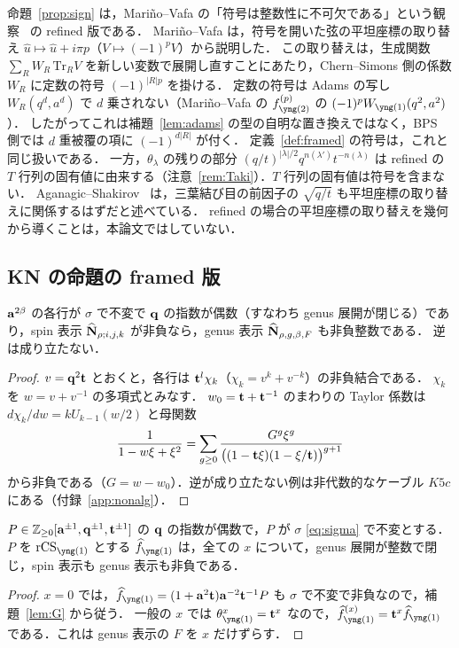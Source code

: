 命題~\ref{prop:sign} は，Mariño--Vafa の「符号は整数性に不可欠である」という観察~\cite{Marino01} の refined 版である．
Mariño--Vafa は，符号を開いた弦の平坦座標の取り替え $\hat u\mapsto\hat u+i\pi p$（$V\mapsto(-1)^pV$）から説明した．
この取り替えは，生成関数 $\sum_RW_R\,\mathrm{Tr}_RV$ を新しい変数で展開し直すことにあたり，Chern--Simons 側の係数 $W_R$ に定数の符号 $(-1)^{|R|p}$ を掛ける．
定数の符号は Adams の写し $W_R(q^d,a^d)$ で $d$ 乗されない（Mariño--Vafa の $f^{(p)}_{\yng(2)}$ の $(-1)^pW_{\yng(1)}(q^2,a^2)$）．
したがってこれは補題~\ref{lem:adams} の型の自明な置き換えではなく，BPS 側では $d$ 重被覆の項に $(-1)^{d|R|}$ が付く．
定義~\ref{def:framed} の符号は，これと同じ扱いである．
一方，$\theta_\lambda$ の残りの部分 $(q/t)^{|\lambda|/2}q^{n(\lambda')}t^{-n(\lambda)}$ は refined の $T$ 行列の固有値に由来する（注意~\ref{rem:Taki}）．$T$ 行列の固有値は符号を含まない．
Aganagic--Shakirov~\cite{Aganagic11} は，三葉結び目の前因子の $\sqrt{q/t}$ も平坦座標の取り替えに関係するはずだと述べている．
refined の場合の平坦座標の取り替えを幾何から導くことは，本論文ではしていない．

\subsection{KN の命題の framed 版}
\begin{lemma}\label{lem:G}
$\mathbf{a}^{2\beta}$ の各行が $\sigma$ で不変で $\mathbf{q}$ の指数が偶数（すなわち genus 展開が閉じる）であり，spin 表示 $\widehat{\mathbf{N}}_{\rho;i,j,k}$ が非負なら，genus 表示 $\widehat{\mathbf{N}}_{\rho,g,\beta,F}$ も非負整数である．
逆は成り立たない．
\end{lemma}
\begin{proof}
$v=\mathbf{q}^2\mathbf{t}$ とおくと，各行は $\mathbf{t}^l\chi_k$（$\chi_k=v^k+v^{-k}$）の非負結合である．
$\chi_k$ を $w=v+v^{-1}$ の多項式とみなす．
$w_0=\mathbf{t}+\mathbf{t}^{-1}$ のまわりの Taylor 係数は $d\chi_k/dw=kU_{k-1}(w/2)$ と母関数
\[
\frac{1}{1-w\xi+\xi^2}=\sum_{g\ge0}\frac{G^g \xi^g}{\bigl((1-\mathbf{t} \xi)(1-\xi/\mathbf{t})\bigr)^{g+1}}
\]
から非負である（$G=w-w_0$）．逆が成り立たない例は非代数的なケーブル $K5c$ にある（付録~\ref{app:nonalg}）．
\end{proof}

\begin{proposition}\label{prop:one}
$P\in\mathbb{Z}_{\ge0}[\mathbf{a}^{\pm1},\mathbf{q}^{\pm1},\mathbf{t}^{\pm1}]$ の $\mathbf{q}$ の指数が偶数で，$P$ が $\sigma$ \eqref{eq:sigma} で不変とする．
$P$ を $\rCS_{\yng(1)}$ とする $\hf_{\yng(1)}$ は，全ての $x$ について，genus 展開が整数で閉じ，spin 表示も genus 表示も非負である．
\end{proposition}
\begin{proof}
$x=0$ では，$\hf_{\yng(1)}=(1+\ba^2\bt)\ba^{-2}\bt^{-1}P$ も $\sigma$ で不変で非負なので，補題~\ref{lem:G} から従う．
一般の $x$ では $\theta_{\yng(1)}^x=\bt^x$ なので，$\hf^{(x)}_{\yng(1)}=\bt^x\hf_{\yng(1)}$ である．これは genus 表示の $F$ を $x$ だけずらす．
\end{proof}

